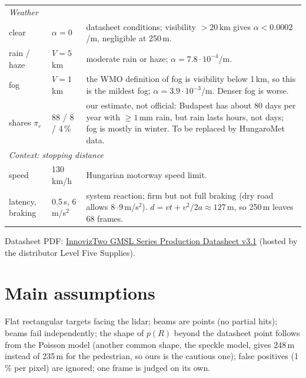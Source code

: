 \documentclass[11pt,a4paper]{article}
\begin{document}
\begin{tabularx}{\textwidth}{l l X}
  \midrule
  \multicolumn{3}{l}{\textit{Weather}} \\
  clear & $\alpha = 0$ & datasheet conditions; visibility $> 20$\,km gives $\alpha < 0.0002$/m, negligible at 250\,m. \\
  rain / haze & $V = 5$\,km & moderate rain or haze; $\alpha = 7.8\cdot10^{-4}$/m. \\
  fog & $V = 1$\,km & the WMO definition of fog is visibility below 1\,km, so this is the mildest fog; $\alpha = 3.9\cdot10^{-3}$/m.
    Denser fog is worse. \\
  shares $\pi_c$ & 88 / 8 / 4\,\% & our estimate, not official: Budapest has about 80 days per year with $\ge 1$\,mm rain,
    but rain lasts hours, not days; fog is mostly in winter. To be replaced by HungaroMet data. \\
  \midrule
  \multicolumn{3}{l}{\textit{Context: stopping distance}} \\
  speed & 130\,km/h & Hungarian motorway speed limit. \\
  latency, braking & 0.5\,s, 6\,m/s$^2$ & system reaction; firm but not full braking (dry road allows 8--9\,m/s$^2$).
    $d = vt + v^2/2a \approx 127$\,m, so 250\,m leaves 68 frames. \\
  \bottomrule
\end{tabularx}
\normalsize

Datasheet PDF: \href{https://levelfivesupplies.com/wp-content/uploads/2023/08/InnovizTwo-GMSL-Series-Production-Datasheet_v3.1-1.pdf}{InnovizTwo GMSL Series Production Datasheet v3.1} (hosted by the distributor Level Five Supplies).

\section{Main assumptions}
Flat rectangular targets facing the lidar; beams are points (no partial hits); beams fail
independently; the shape of $p(R)$ beyond the datasheet point follows from the Poisson model
(another common shape, the speckle model, gives 248\,m instead of 235\,m for the pedestrian, so ours
is the cautious one); false positives (1\,\% per pixel) are ignored; one frame is judged on its own.
\end{document}
